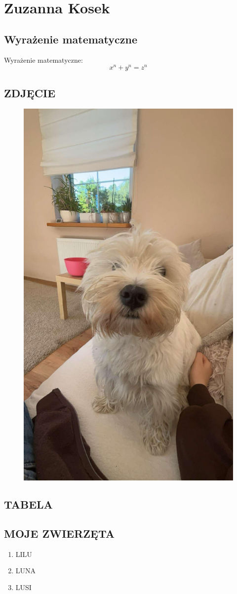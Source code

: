 
% 
\section{Zuzanna Kosek}

\subsection{Wyrażenie matematyczne}
Wyrażenie matematyczne:
\[ x^n + y^n = z^n \]

\subsection{ZDJĘCIE}
\begin{figure}[h]
    \centering
    \includegraphics[width=0.25\linewidth]{pictures/a1ba4d86-c4ff-4f0f-94cb-9909135f7061.jpg}
    \label{LILU}
\end{figure}



\subsection{TABELA}
\begin{figure}[h]
    \centering
    
    \label{TABELA}
\end{figure}

\subsection{MOJE ZWIERZĘTA}
\begin{enumerate}
    \item LILU
    \item LUNA
    \item LUSI
\end{enumerate}

